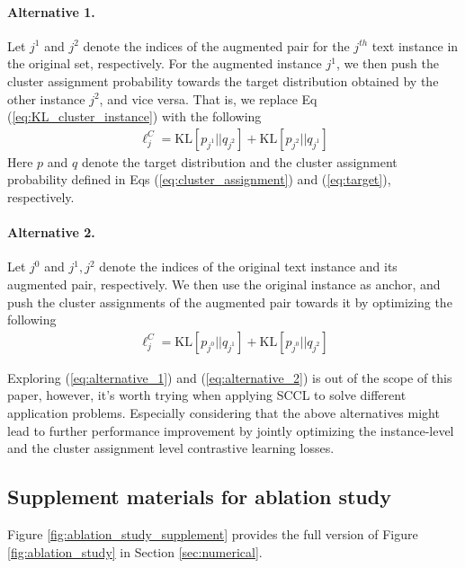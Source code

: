 \documentclass[11pt]{article}
\begin{document}
\paragraph{Alternative 1.}{Let $j^1$ and $j^2$ denote the indices of the augmented pair for the $j^{th}$ text instance in the original set, respectively. For the augmented instance $j^1$, we then push the cluster assignment probability towards the target distribution obtained by the other instance $j^2$, and vice versa.  That is, we replace Eq (\ref{eq:KL_cluster_instance}) with the following  
\begin{align}
    \ell_j^C = \text{KL}\left[p_{j^1} || q_{j^2}\right] + \text{KL}\left[p_{j^2} || q_{j^1}\right]
    \label{eq:alternative_1}
\end{align}
Here $p$ and $q$ denote the target distribution and the cluster assignment probability defined in Eqs (\ref{eq:cluster_assignment}) and (\ref{eq:target}), respectively.
}

\paragraph{Alternative 2.}{Let $j^0$ and $j^1, j^2$ denote the indices of the original text instance and its augmented pair, respectively. We then use the original instance as anchor, and push the cluster assignments of the augmented pair towards it by optimizing the following
\begin{align}
    \ell_j^C = \text{KL}\left[p_{j^0} || q_{j^1}\right] + \text{KL}\left[p_{j^0} || q_{j^2}\right]
    \label{eq:alternative_2}
\end{align}

Exploring (\ref{eq:alternative_1}) and (\ref{eq:alternative_2}) is out of the scope of this paper, however, it's worth trying when applying SCCL to solve different application problems. Especially considering that the above alternatives might lead to further performance improvement by jointly optimizing the instance-level and the cluster assignment level contrastive learning losses. 
}



\subsection{Supplement materials for ablation study}
\label{appdix:ablation}
Figure \ref{fig:ablation_study_supplement} provides the full version of Figure \ref{fig:ablation_study} in Section \ref{sec:numerical}.
\end{document}

